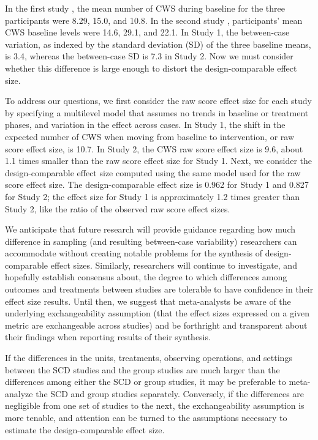 \documentclass[
]{book}
\begin{document}
In the first study \citep{parker2012Application}, the mean number of CWS during baseline for the three participants were 8.29, 15.0, and 10.8. In the second study \citep{stotz2008Effects}, participants' mean CWS baseline levels were 14.6, 29.1, and 22.1. In Study 1, the between-case variation, as indexed by the standard deviation (SD) of the three baseline means, is 3.4, whereas the between-case SD is 7.3 in Study 2. Now we must consider whether this difference is large enough to distort the design-comparable effect size.

To address our questions, we first consider the raw score effect size for each study by specifying a multilevel model that assumes no trends in baseline or treatment phases, and variation in the effect across cases. In Study 1, the shift in the expected number of CWS when moving from baseline to intervention, or raw score effect size, is 10.7. In Study 2, the CWS raw score effect size is 9.6, about 1.1 times smaller than the raw score effect size for Study 1. Next, we consider the design-comparable effect size computed using the same model used for the raw score effect size. The design-comparable effect size is 0.962 for Study 1 and 0.827 for Study 2; the effect size for Study 1 is approximately 1.2 times greater than Study 2, like the ratio of the observed raw score effect sizes.

We anticipate that future research will provide guidance regarding how much difference in sampling (and resulting between-case variability) researchers can accommodate without creating notable problems for the synthesis of design-comparable effect sizes. Similarly, researchers will continue to investigate, and hopefully establish consensus about, the degree to which differences among outcomes and treatments between studies are tolerable to have confidence in their effect size results. Until then, we suggest that meta-analysts be aware of the underlying exchangeability assumption (that the effect sizes expressed on a given metric are exchangeable across studies) and be forthright and transparent about their findings when reporting results of their synthesis.

If the differences in the units, treatments, observing operations, and settings between the SCD studies and the group studies are much larger than the differences among either the SCD or group studies, it may be preferable to meta-analyze the SCD and group studies separately. Conversely, if the differences are negligible from one set of studies to the next, the exchangeability assumption is more tenable, and attention can be turned to the assumptions necessary to estimate the design-comparable effect size.
\end{document}
